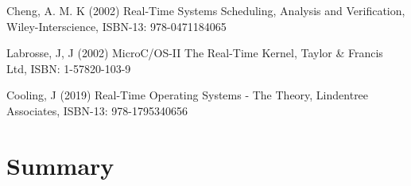 \documentclass[10pt]{article}
\begin{document}
\begin{thebibliography}{9} %

 Cheng, A. M. K (2002) Real-Time Systems Scheduling, Analysis and Verification, Wiley-Interscience, ISBN-13: 978-0471184065

 Labrosse, J, J (2002) MicroC/OS-II The Real-Time Kernel, Taylor \& Francis Ltd, ISBN: 1-57820-103-9

 Cooling, J (2019) Real-Time Operating Systems - The Theory, Lindentree Associates, ISBN-13: 978-1795340656

\end{thebibliography}

\section{Summary}
\end{document}
